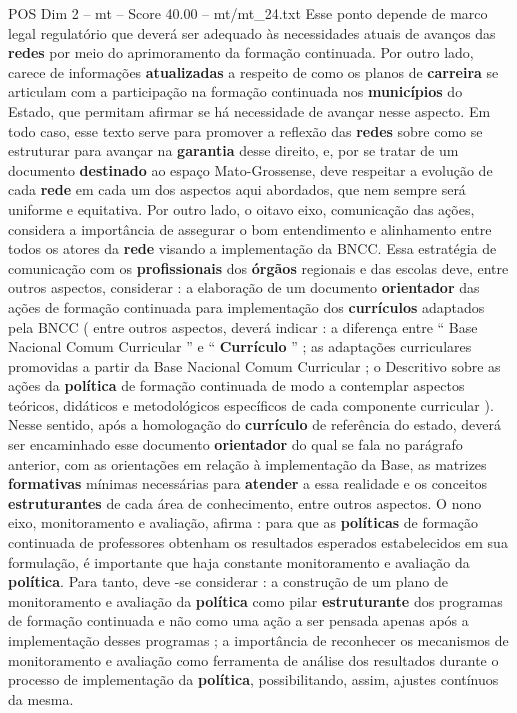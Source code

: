 \begin{textsample}{POS Dim 2 – mt – Score 40.00 – mt/mt\_24.txt}
Esse ponto depende de marco legal regulatório que deverá ser adequado às necessidades atuais de avanços das \textbf{redes} por meio do aprimoramento da formação continuada.
Por outro lado, carece de informações \textbf{atualizadas} a respeito de como os planos de \textbf{carreira} se articulam com a participação na formação continuada nos \textbf{municípios} do Estado, que permitam afirmar se há necessidade de avançar nesse aspecto.
Em todo caso, esse texto serve para promover a reflexão das \textbf{redes} sobre como se estruturar para avançar na \textbf{garantia} desse direito, e, por se tratar de um documento \textbf{destinado} ao espaço Mato-Grossense, deve respeitar a evolução de cada \textbf{rede} em cada um dos aspectos aqui abordados, que nem sempre será uniforme e equitativa.
Por outro lado, o oitavo eixo, comunicação das ações, considera a importância de assegurar o bom entendimento e alinhamento entre todos os atores da \textbf{rede} visando a implementação da BNCC.
Essa estratégia de comunicação com os \textbf{profissionais} dos \textbf{órgãos} regionais e das escolas deve, entre outros aspectos, considerar : a elaboração de um documento \textbf{orientador} das ações de formação continuada para implementação dos \textbf{currículos} adaptados pela BNCC ( entre outros aspectos, deverá indicar : a diferença entre “ Base Nacional Comum Curricular ” e “ \textbf{Currículo} ” ; as adaptações curriculares promovidas a partir da Base Nacional Comum Curricular ; o Descritivo sobre as ações da \textbf{política} de formação continuada de modo a contemplar aspectos teóricos, didáticos e metodológicos específicos de cada componente curricular ).
Nesse sentido, após a homologação do \textbf{currículo} de referência do estado, deverá ser encaminhado esse documento \textbf{orientador} do qual se fala no parágrafo anterior, com as orientações em relação à implementação da Base, as matrizes \textbf{formativas} mínimas necessárias para \textbf{atender} a essa realidade e os conceitos \textbf{estruturantes} de cada área de conhecimento, entre outros aspectos.
O nono eixo, monitoramento e avaliação, afirma : para que as \textbf{políticas} de formação continuada de professores obtenham os resultados esperados estabelecidos em sua formulação, é importante que haja constante monitoramento e avaliação da \textbf{política}.
Para tanto, deve -se considerar : a construção de um plano de monitoramento e avaliação da \textbf{política} como pilar \textbf{estruturante} dos programas de formação continuada e não como uma ação a ser pensada apenas após a implementação desses programas ; a importância de reconhecer os mecanismos de monitoramento e avaliação como ferramenta de análise dos resultados durante o processo de implementação da \textbf{política}, possibilitando, assim, ajustes contínuos da mesma.

\end{textsample}
